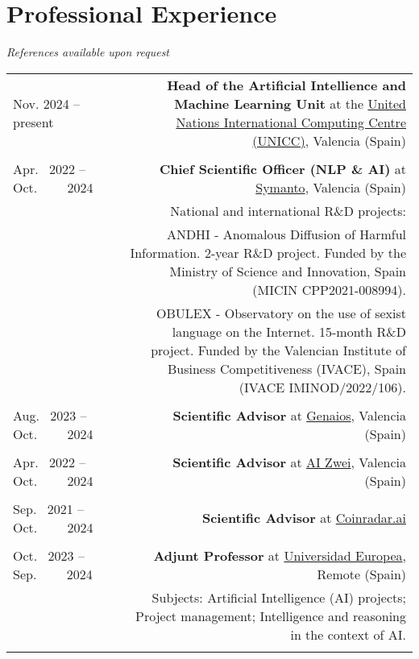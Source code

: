 \documentclass[10pt]{article}
\begin{document}
\section*{Professional Experience}

\textit{References available upon request}\vspace{5pt}\\

\begin{tabular}{L!{\VRule}R}

Nov. 2024 -- present~~~~~~~~ &{\textbf{Head of the Artificial Intellience and Machine Learning Unit} at the \href{https://www.unicc.org/}{United Nations International Computing Centre (UNICC)}, Valencia (Spain)}\\
&\\

Apr.~ 2022 -- Oct.~~~~ 2024 &{\textbf{Chief Scientific Officer (NLP \& AI)} at \href{https://www.symanto.com/}{Symanto}, Valencia (Spain)}\\
&\scriptsize{National and international R\&D projects:}\\
&\scriptsize{\textcolor{white}{ssss}ANDHI - Anomalous Diffusion of Harmful Information. 2-year R\&D project. Funded by the Ministry of Science and Innovation, Spain (MICIN CPP2021-008994).}\\
&\scriptsize{\textcolor{white}{ssss}OBULEX - Observatory on the use of sexist language on the Internet. 15-month R\&D project. Funded by the Valencian Institute of Business Competitiveness (IVACE), Spain (IVACE IMINOD/2022/106)}. \\
&\\

Aug.~ 2023 -- Oct.~~~~ 2024 &{\textbf{Scientific Advisor} at \href{https://genaios.ai/}{Genaios}, Valencia (Spain)}\\
&\\

Apr.~ 2022 -- Oct.~~~~ 2024 &{\textbf{Scientific Advisor} at \href{https://www.aizwei.com/}{AI Zwei}, Valencia (Spain)}\\
&\\

Sep.~ 2021 -- Oct.~~~~ 2024 &{\textbf{Scientific Advisor} at \href{https://coinradar.ai/}{Coinradar.ai}}\\
&\\

Oct.~ 2023 -- Sep.~~~~ 2024 &{\textbf{Adjunt Professor} at \href{https://universidadeuropea.com/}{Universidad Europea}, Remote (Spain)}\\
& \scriptsize{Subjects: Artificial Intelligence (AI) projects; Project management; Intelligence and reasoning in the context of AI.}\\
&\\
\end{tabular}
\end{document}
